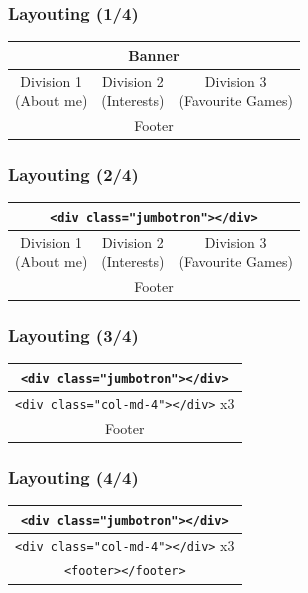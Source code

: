 \documentclass[12pt]{beamer}
\begin{document}
\begin{frame}
\frametitle{Layouting (1/4)}
\begin{center}
	\begin{tabular}{|c|c|c|}
		\hline
		\multicolumn{3}{|c|}{Banner} \\ \hline
		\shortstack{Division 1 \\ (About me)} & \shortstack{Division 2 \\ (Interests)} & \shortstack{Division 3 \\ (Favourite Games)} \\ \hline
		\multicolumn{3}{|c|}{Footer} \\ \hline
	\end{tabular}
\end{center}
\end{frame}


\begin{frame}[fragile]
\frametitle{Layouting (2/4)}
\begin{center}
	\begin{tabular}{|c|c|c|}
		\hline
		\multicolumn{3}{|c|}{\texttt{<div class="jumbotron"></div>}} \\ \hline
		\shortstack{Division 1 \\ (About me)} & \shortstack{Division 2 \\ (Interests)} & \shortstack{Division 3 \\ (Favourite Games)} \\ \hline
		\multicolumn{3}{|c|}{Footer} \\ \hline
	\end{tabular}
\end{center}
\end{frame}

\begin{frame}[fragile]
\frametitle{Layouting (3/4)}
\begin{center}
	\begin{tabular}{|p{3.5cm}|p{3.5cm}|p{3.5cm}|}
		\hline
		\multicolumn{3}{|c|}{\texttt{<div class="jumbotron"></div>}} \\ \hline
		\multicolumn{3}{|c|}{\texttt{<div class="col-md-4"></div>} x3} \\ \hline
		\multicolumn{3}{|c|}{Footer} \\ \hline
	\end{tabular}
\end{center}
\end{frame}

\begin{frame}[fragile]
\frametitle{Layouting (4/4)}
\begin{center}
	\begin{tabular}{|p{3.5cm}|p{3.5cm}|p{3.5cm}|}
		\hline
		\multicolumn{3}{|c|}{\texttt{<div class="jumbotron"></div>}} \\ \hline
		\multicolumn{3}{|c|}{\texttt{<div class="col-md-4"></div>} x3} \\ \hline
		\multicolumn{3}{|c|}{\texttt{<footer></footer>}} \\ \hline
	\end{tabular}
\end{center}
\end{frame}
\end{document}
